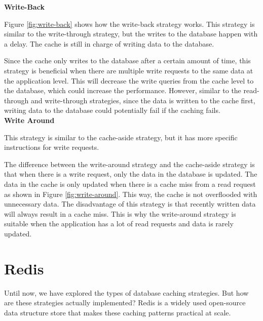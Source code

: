 \noindent \textbf{Write-Back}

Figure \ref{fig:write-back} shows how the write-back strategy works. This strategy is similar to the write-through strategy, but the writes to the database happen with a delay. The cache is still in charge of writing data to the database.

\writeBackFigure

\noindent Since the cache only writes to the database after a certain amount of time,
this strategy is beneficial when there are multiple write requests to the same data at the application level.
This will decrease the write queries from the cache level to the database, which could increase the performance.
However, similar to the read-through and write-through strategies, since the data is written to the cache first,
writing data to the database could potentially fail if the caching fails.\\

\noindent \textbf{Write Around}

This strategy is similar to the cache-aside strategy, but it has more specific instructions for write requests.

\writeAroundFigure

\noindent The difference between the write-around strategy and the cache-aside strategy is that when there is a write request, only the data in the database is updated.
The data in the cache is only updated when there is a cache miss from a read request as shown in Figure \ref{fig:write-around}. This way, the cache is not overflooded with unnecessary data. The disadvantage of this strategy is that recently written data will always result in a cache miss. This is why the write-around strategy is suitable when the application has a lot of read requests and data is rarely updated.

\section[Redis]{Redis}
Until now, we have explored the types of database caching strategies. But how are these strategies actually implemented?
Redis is a widely used open-source data structure store that makes these caching patterns practical at scale.

